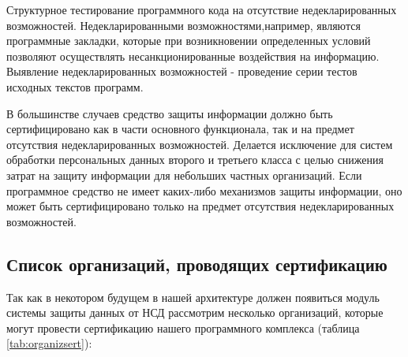 Структурное тестирование программного кода на отсутствие недекларированных возможностей. Недекларированными возможностями,например, являются программные закладки, которые при возникновении определенных условий позволяют осуществлять несанкционированные воздействия на информацию. Выявление недекларированных возможностей - проведение серии тестов исходных текстов программ.

В большинстве случаев средство защиты информации должно быть сертифицировано как в части основного функционала, так и на предмет отсутствия недекларированных возможностей. Делается исключение для систем обработки персональных данных второго и третьего класса с целью снижения затрат на защиту информации для небольших частных организаций. Если программное средство не имеет каких-либо механизмов защиты информации, оно может быть сертифицировано только на предмет отсутствия недекларированных возможностей. \cite{eshelon}

\subsection{Список организаций, проводящих сертификацию}

Так как в некотором будущем в нашей архитектуре должен появиться модуль системы защиты данных от НСД рассмотрим несколько организаций, которые могут провести сертификацию нашего программного комплекса (таблица \ref{tab:organizsert}):

